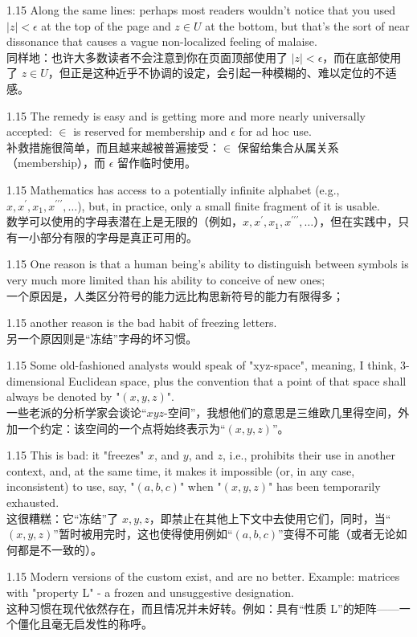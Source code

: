 \documentclass[12pt,a4paper]{article}
\newcommand{\bilingual}[2]{
    \begin{spacing}{1.15} %
        \noindent \normalsize #1 \\[-0.5ex] %
        \small \textcolor{blue!70!black}{#2} %
    \end{spacing}
    \vspace{0.8em} %
}
\begin{document}
\bilingual{Along the same lines: perhaps most readers wouldn't notice that you used $|z|<\epsilon$ at the top of the page and $z \in U$ at the bottom, but that's the sort of near dissonance that causes a vague non-localized feeling of malaise.}
{同样地：也许大多数读者不会注意到你在页面顶部使用了 $|z|<\epsilon$，而在底部使用了 $z \in U$，但正是这种近乎不协调的设定，会引起一种模糊的、难以定位的不适感。} %

\bilingual{The remedy is easy and is getting more and more nearly universally accepted: $\in$ is reserved for membership and $\epsilon$ for ad hoc use.}
{补救措施很简单，而且越来越被普遍接受：$\in$ 保留给集合从属关系（membership），而 $\epsilon$ 留作临时使用。} %

\bilingual{Mathematics has access to a potentially infinite alphabet (e.g., $x, x^{\prime}, x_{1}, x^{\prime\prime\prime}, \dots$), but, in practice, only a small finite fragment of it is usable.}
{数学可以使用的字母表潜在上是无限的（例如，$x, x^{\prime}, x_{1}, x^{\prime\prime\prime}, \dots$），但在实践中，只有一小部分有限的字母是真正可用的。} %

\bilingual{One reason is that a human being's ability to distinguish between symbols is very much more limited than his ability to conceive of new ones;}
{一个原因是，人类区分符号的能力远比构思新符号的能力有限得多；} %

\bilingual{another reason is the bad habit of freezing letters.}
{另一个原因则是“冻结”字母的坏习惯。} %

\bilingual{Some old-fashioned analysts would speak of "xyz-space", meaning, I think, 3-dimensional Euclidean space, plus the convention that a point of that space shall always be denoted by "$(x,y,z)$".}
{一些老派的分析学家会谈论“$xyz$-空间”，我想他们的意思是三维欧几里得空间，外加一个约定：该空间的一个点将始终表示为“$(x,y,z)$”。} %

\bilingual{This is bad: it "freezes" $x$, and $y$, and $z$, i.e., prohibits their use in another context, and, at the same time, it makes it impossible (or, in any case, inconsistent) to use, say, "$(a,b,c)$" when "$(x,y,z)$" has been temporarily exhausted.}
{这很糟糕：它“冻结”了 $x, y, z$，即禁止在其他上下文中去使用它们，同时，当“$(x,y,z)$”暂时被用完时，这也使得使用例如“$(a,b,c)$”变得不可能（或者无论如何都是不一致的）。} %

\bilingual{Modern versions of the custom exist, and are no better. Example: matrices with "property L" - a frozen and unsuggestive designation.}
{这种习惯在现代依然存在，而且情况并未好转。例如：具有“性质 L”的矩阵——一个僵化且毫无启发性的称呼。} %
\end{document}
